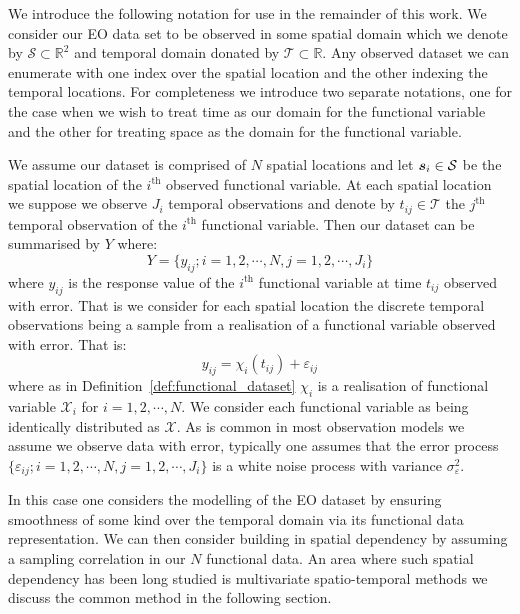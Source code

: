 We introduce the following notation for use in the remainder of this work.
We consider our EO data set to be observed in some spatial domain which we denote by $\mathcal{S} \subset \mathbb{R}^2$ and temporal domain donated by $\mathcal{T} \subset \mathbb{R}$.
Any observed dataset we can enumerate with one index over the spatial location and the other indexing the temporal locations.
For completeness we introduce two separate notations, one for the case when we wish to treat time as our domain for the functional variable and the other for treating space as the domain for the functional variable.

We assume our dataset is comprised of $N$ spatial locations and let $\bm{{s}}_i \in \mathcal{S}$ be the spatial location of the $i^\text{th}$ observed functional variable.
At each spatial location we suppose we observe $J_i$ temporal observations and denote by $t_{ij} \in \mathcal{T}$ the $j^\text{th}$ temporal observation of the $i^\text{th}$ functional variable.
Then our dataset can be summarised by $Y$ where:
\begin{equation}
	Y = \{ y_{ij}; i=1,2,\cdots,N, j=1,2, \cdots, J_i \}
	\label{eqn:observed_data}
\end{equation}
where $y_{ij}$ is the response value of the $i^\text{th}$ functional variable at time $t_{ij}$ observed with error.
That is we consider for each spatial location the discrete temporal observations being a sample from a realisation of a functional variable observed with error.
That is:
\begin{equation}
	y_{ij} = \chi_{i}\left( t_{ij} \right) + \varepsilon_{ij}
	\label{eqn:fd_temporal}
\end{equation}
where as in Definition~\ref{def:functional_dataset} $\chi_i$ is a realisation of functional variable $\mathcal{X}_i$ for $i=1,2,\cdots,N$.
We consider each functional variable as being identically distributed as $\mathcal{X}$.
As is common in most observation models we assume we observe data with error, typically one assumes that the error process $\{\varepsilon_{ij}; i=1,2,\cdots,N, j=1,2,\cdots,J_i\}$ is a white noise process with variance $\sigma_\varepsilon^2$. 

In this case one considers the modelling of the EO dataset by ensuring smoothness of some kind over the temporal domain via its functional data representation.
We can then consider building in spatial dependency by assuming a sampling correlation in our $N$ functional data.
An area where such spatial dependency has been long studied is multivariate spatio-temporal methods we discuss the common method in the following section. 

